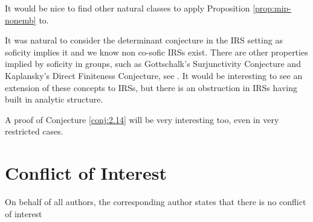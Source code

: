 \documentclass[pdflatex,sn-mathphys-num]{sn-jnl}%
\begin{document}
It would be nice to find other natural classes to apply Proposition \ref{prop:mip-nonemb} to.

It was natural to consider the determinant conjecture in the IRS setting as soficity implies it and we know non co-sofic IRSs exist. There are other properties implied by soficity in groups, such as Gottschalk’s Surjunctivity Conjecture and Kaplansky’s Direct Finiteness Conjecture, see \cite{elek_hyperlinearity_2005}. It would be interesting to see an extension of these concepts to IRSs, but there is an obstruction in IRSs having built in analytic structure. 

A proof of Conjecture \ref{conj:2.14} will be very interesting too, even in very restricted cases.
\section*{Conflict of Interest}
On behalf of all authors, the corresponding author states that there is no conflict of interest

\end{document}
